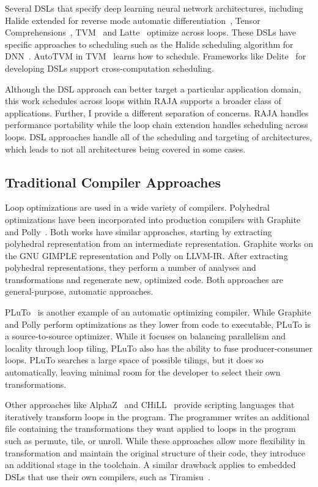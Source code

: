 Several DSLs that specify deep learning neural network
architectures, including Halide extended for reverse mode automatic
differentiation~\cite{Li2018}, Tensor Comprehensions~\cite{Vasilache2018},
TVM~\cite{TVM2018} and Latte~\cite{TruongLatte2016} optimize across loops.
These DSLs have specific approaches to scheduling such as the Halide scheduling
algorithm for DNN~\cite{Yang2020}.
AutoTVM in TVM~\cite{Chen2019} learns how to schedule.
Frameworks like Delite~\cite{Sujeeth2014} for developing DSLs support 
cross-computation scheduling.

Although the DSL approach can better target a particular application domain,
this work schedules across loops within RAJA supports a broader class of
applications.
Further, I provide a different separation of concerns. RAJA handles
performance portability while the loop chain extension handles scheduling
across loops.
DSL approaches handle all of the scheduling and targeting of architectures,
which leads to not all architectures being covered in some cases.

\subsection{Traditional Compiler Approaches}

Loop optimizations are used in a wide variety of compilers.
Polyhedral optimizations have been incorporated into production compilers with Graphite~\cite{trifunovic2010graphite} and Polly~\cite{grosser2011polly}.
Both works have similar approaches, starting by extracting polyhedral representation from an intermediate representation. 
Graphite works on the GNU GIMPLE representation and Polly on LLVM-IR\@.
After extracting polyhedral representations, they perform a number of analyses and transformations and regenerate new, optimized code.
Both approaches are general-purpose, automatic approaches.

PLuTo~\cite{bondhugula2008pluto} is another example of an automatic optimizing compiler. 
While Graphite and Polly perform optimizations as they lower from code to executable, PLuTo is a source-to-source optimizer. 
While it focuses on balancing parallelism and locality through loop tiling, PLuTo also has the ability to fuse producer-consumer loops. 
PLuTo searches a large space of possible tilings, but it does so automatically, leaving minimal room for the developer to select their own transformations.

Other approaches like AlphaZ~\cite{yuki2012alphaz} and CHiLL~\cite{tiwari2009scalable} provide scripting languages that iteratively transform loops in the program. 
The programmer writes an additional file containing the transformations they want applied to loops in the program such as permute, tile, or unroll. 
While these approaches allow more flexibility in transformation and maintain the original structure of their code, they introduce an additional stage in the toolchain.
A similar drawback applies to embedded DSLs that use their own compilers, such as Tiramisu~\cite{baghdadi2019tiramisu}.




